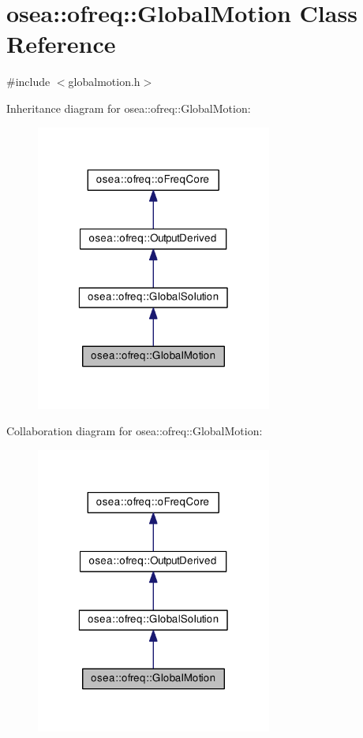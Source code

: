 \hypertarget{classosea_1_1ofreq_1_1_global_motion}{\section{osea\-:\-:ofreq\-:\-:Global\-Motion Class Reference}
\label{classosea_1_1ofreq_1_1_global_motion}
}


{\ttfamily \#include $<$globalmotion.\-h$>$}



Inheritance diagram for osea\-:\-:ofreq\-:\-:Global\-Motion\-:
\nopagebreak
\begin{figure}[H]
\begin{center}
\leavevmode
\includegraphics[width=220pt]{classosea_1_1ofreq_1_1_global_motion__inherit__graph}
\end{center}
\end{figure}


Collaboration diagram for osea\-:\-:ofreq\-:\-:Global\-Motion\-:
\nopagebreak
\begin{figure}[H]
\begin{center}
\leavevmode
\includegraphics[width=220pt]{classosea_1_1ofreq_1_1_global_motion__coll__graph}
\end{center}
\end{figure}
